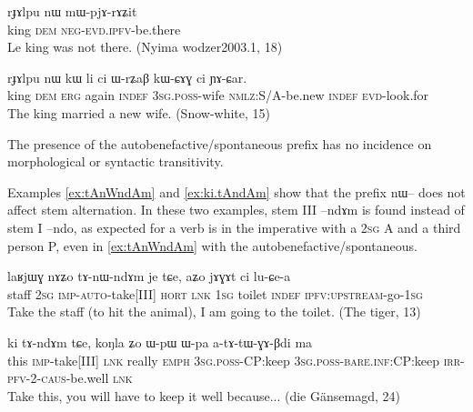 \documentclass[oldfontcommands,oneside,a4paper,11pt]{article}
\newcommand{\ipa}[1]{{\phon \mbox{#1}}} %
\begin{document}
 \begin{exe}
\ex \label{ex:abs}
\gll
\ipa{rɟɤlpu}  	\ipa{nɯ}  	\ipa{mɯ-pjɤ-rɤʑit}  \\
king \textsc{dem} \textsc{neg-evd.ipfv}-be.there \\
 \glt Le king was not there. (Nyima wodzer2003.1, 18)
\end{exe}

 \begin{exe}
\ex \label{ex:erg}
\gll 
\ipa{rɟɤlpu}  	\ipa{nɯ}  	\ipa{kɯ}  	\ipa{li}  	\ipa{ci}  	\ipa{ɯ-rʑaβ}  	\ipa{kɯ-ɕɤɣ}  	\ipa{ci}  	\ipa{ɲɤ-ɕar.}  	 \\
king \textsc{dem} \textsc{erg} again \textsc{indef} \textsc{3sg.poss}-wife \textsc{nmlz}:S/A-be.new \textsc{indef}  \textsc{evd}-look.for \\
\glt The king married a new wife. (Snow-white, 15)
\end{exe}

 The presence of the autobenefactive/spontaneous prefix has no incidence on  morphological or syntactic transitivity. 
 
 Examples \ref{ex:tAnWndAm} and \ref{ex:ki.tAndAm} show that the prefix \ipa{nɯ--} does not affect stem alternation. In these two examples, stem III   \ipa{--ndɤm} is found instead of stem I \ipa{--ndo}, as expected for a verb is in the imperative with a \textsc{2sg} A and a third person P, even in \ref{ex:tAnWndAm} with the autobenefactive/spontaneous.
 

 \begin{exe}
\ex \label{ex:tAnWndAm}
\gll
\ipa{laʁjɯɣ} 	\ipa{nɤʑo} 	\ipa{tɤ-nɯ-ndɤm} 	\ipa{je} 	\ipa{tɕe,} 	\ipa{aʑo} 	\ipa{jɤɣɤt} 	\ipa{ci} 	\ipa{lu-ɕe-a} 	\\
staff \textsc{2sg} \textsc{imp-auto}-take[III] \textsc{hort} \textsc{lnk} \textsc{1sg} toilet \textsc{indef} \textsc{ipfv:upstream}-go-\textsc{1sg} \\
\glt Take the staff (to hit the animal), I am going to the toilet. (The tiger, 13) 
\end{exe}

 \begin{exe}
\ex \label{ex:ki.tAndAm}
\gll
\ipa{ki}  	\ipa{tɤ-ndɤm}  	\ipa{tɕe,}  	\ipa{koŋla}  	\ipa{ʑo}   \ipa{ɯ-pɯ}  	\ipa{ɯ-pa}  	\ipa{a-tɤ-tɯ-ɣɤ-βdi}  	\ipa{ma}  \\
this \textsc{imp}-take[III] \textsc{lnk} really \textsc{emph} \textsc{3sg.poss}-CP:keep \textsc{3sg.poss}-\textsc{bare.inf}:CP:keep \textsc{irr-pfv-2-caus}-be.well \textsc{lnk} \\
\glt Take this, you will have to keep it well because... (die Gänsemagd, 24)
\end{exe}
\end{document}
